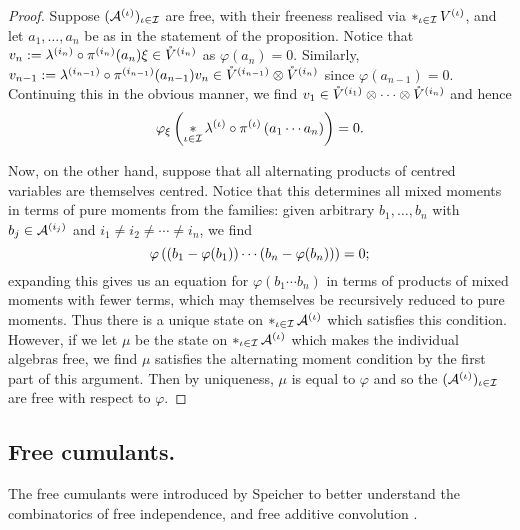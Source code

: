 \begin{proof}
	Suppose $(\mathcal{A}^{(\iota)})_{\iota\in\mathcal{I}}$ are free, with their freeness realised via $\mathop{\ast}_{\iota\in\mathcal{I}}V^{(\iota)}$, and let $a_1, \ldots, a_n$ be as in the statement of the proposition.
	Notice that $v_n := \lambda^{(i_n)}\circ\pi^{(i_n)}(a_n)\xi \in \mathring{V}^{(i_n)}$ as $\varphi(a_n) = 0$.
	Similarly, $v_{n-1} := \lambda^{(i_{n-1})}\circ\pi^{(i_{n-1})}(a_{n-1})v_n \in \mathring{V}^{(i_{n-1})}\otimes \mathring{V}^{(i_n)}$ since $\varphi(a_{n-1}) = 0$.
	Continuing this in the obvious manner, we find $v_1 \in \mathring{V}^{(i_1)}\otimes\cdots\otimes\mathring{V}^{(i_n)}$ and hence
$$\varphi_\xi\left(\mathop{\ast}_{\iota\in\mathcal{I}}\lambda^{(\iota)}\circ\pi^{(\iota)}\left(a_1\cdots a_n\right)\right) = 0.$$

	Now, on the other hand, suppose that all alternating products of centred variables are themselves centred.
	Notice that this determines all mixed moments in terms of pure moments from the families: given arbitrary $b_1, \ldots, b_n$ with $b_j \in \mathcal{A}^{(i_j)}$ and $i_1 \neq i_2\neq\cdots\neq i_n$, we find
	$$\varphi\left((b_1-\varphi(b_1))\cdots(b_n-\varphi(b_n))\right) = 0;$$
	expanding this gives us an equation for $\varphi(b_1\cdots b_n)$ in terms of products of mixed moments with fewer terms, which may themselves be recursively reduced to pure moments.
	Thus there is a unique state on $\mathop{\ast}_{\iota\in\mathcal{I}}\mathcal{A}^{(\iota)}$ which satisfies this condition.
	However, if we let $\mu$ be the state on $\mathop{\ast}_{\iota\in\mathcal{I}}\mathcal{A}^{(\iota)}$ which makes the individual algebras free, we find $\mu$ satisfies the alternating moment condition by the first part of this argument.
	Then by uniqueness, $\mu$ is equal to $\varphi$ and so the $(\mathcal{A}^{(\iota)})_{\iota\in\mathcal{I}}$ are free with respect to $\varphi$.
\end{proof}

\subsection{Free cumulants.}
	The free cumulants were introduced by Speicher to better understand the combinatorics of free independence, and free additive convolution \cite{speicher1997free,speicher1994}.


